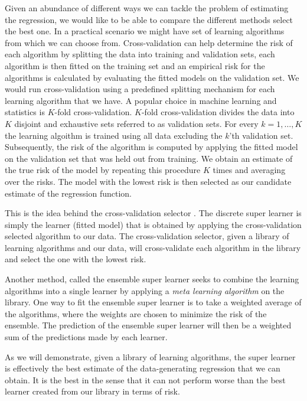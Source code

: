 \documentclass[11pt, a4paper]{article}
\theoremstyle{definition}
\theoremstyle{remark}
\begin{document}
Given an abundance of different ways we can tackle the problem of estimating the regression, we would like to be able to compare the different methods select the best one. In a practical scenario we might have set of learning algorithms from which we can choose from. Cross-validation can help determine the risk of each algorithm by splitting the data into training and validation sets, each algorithm is then fitted on the training set and an empirical risk for the algorithms is calculated by evaluating the fitted models on the validation set. We would run cross-validation using a predefined splitting mechanism for each learning algorithm that we have. A popular choice in machine learning and statistics is $ K $-fold cross-validation. $ K $-fold cross-validation divides the data into $ K $ disjoint and exhaustive sets referred to as validation sets. For every $ k = 1, \dots , K $ the learning algoithm is trained using all data excluding the $ k $'th validation set. Subsequently, the risk of the algorithm is computed by applying the fitted model on the validation set that was held out from training. We obtain an estimate of the true risk of the model by repeating this procedure $ K $ times and averaging over the risks. The model with the lowest risk is then selected as our candidate estimate of the regression function. 

This is the idea behind the cross-validation selector \parencite{laan03}. The discrete super learner \parencite{van2007super} is simply the learner (fitted model) that is obtained by applying the cross-validation selected algorithm to our data. The cross-validation selector, given a library of learning algorithms and our data, will cross-validate each algorithm in the library and select the one with the lowest risk. 

Another method, called the ensemble super learner \parencite{van2007super} seeks to combine the learning algorithms into a single learner by applying a \textit{meta learning algorithm} on the library. One way to fit the ensemble super learner is to take a weighted average of the algorithms, where the weights are chosen to minimize the risk of the ensemble. The prediction of the ensemble super learner will then be a weighted sum of the predictions made by each learner.

As we will demonstrate, given a library of learning algorithms, the super learner is effectively the best estimate of the data-generating regression that we can obtain. It is the best in the sense that it can not perform worse than the best learner created from our library in terms of risk. 
\end{document}
